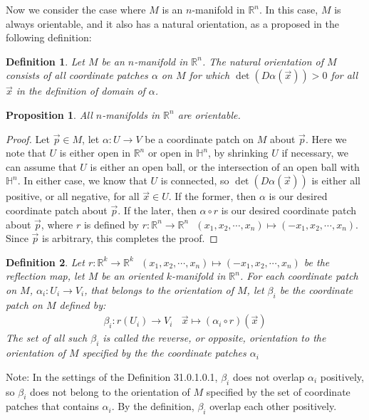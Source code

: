 \documentclass[15pt]{book}
\theoremstyle{break}
\theoremstyle{break}
\newtheorem{prop}[lem]{Proposition}
\newtheorem{defn}{Definition}[corL]
\newcommand{\R}{\mathbb{R}}
\newcommand{\note}{\color{red}Note: \color{black}}
\begin{document}
Now we consider the case where $M$ is an $n$-manifold in $\R^n$. In this case, $M$ is always orientable, and it also has a natural orientation, as a proposed in the following definition:
\begin{defn}
Let $M$ be an $n$-manifold in $\R^n$. The natural orientation of $M$ consists of all coordinate patches $\alpha$ on $M$ for which $\det(D\alpha(\vec{x})) >0$ for all $\vec{x}$ in the definition of domain of $\alpha$. 
\end{defn}

\begin{prop} All $n$-manifolds in $\R^n$ are orientable. 
\end{prop}
\begin{proof}
Let $\vec{p}\in M$, let $\alpha:U \to V$ be a coordinate patch on $M$ about $\vec{p}$. Here we note that $U$ is either open in $\R^n$ or open in $\mathbb{H}^n$, by shrinking $U$ if necessary, we can assume that $U$ is either an open ball, or the intersection of an open ball with $\mathbb{H}^n$. In either case, we know that $U$ is connected, so $\det(D\alpha(\vec{x}))$ is either all positive, or all negative, for all $\vec{x}\in U$. If the former, then $\alpha$ is our desired coordinate patch about $\vec{p}$. If the later, then $\alpha\circ r$ is our desired coordinate patch about $\vec{p}$, where $r$ is defined by $r:\R^n \to \R^n \ \ \ (x_1,x_2,\cdots, x_n) \mapsto (-x_1,x_2,\cdots, x_n)$. Since $\vec{p}$ is arbitrary, this completes the proof. 
\end{proof}

\begin{defn}
Let $r:\R^k \to \R^k \ \ \ (x_1,x_2,\cdots, x_n) \mapsto (-x_1,x_2,\cdots, x_n)$ be the reflection map, let $M$ be an oriented $k$-manifold in $\R^n$. For each coordinate patch on $M$, $\alpha_i :U_i \to V_i$, that belongs to the orientation of $M$, let $\beta_i $ be the coordinate patch on $M$ defined by:
\begin{align*}
\beta_i : r(U_i) \to V_i \ \ \ \ \vec{x}\mapsto (\alpha_i \circ r)(\vec{x})
\end{align*}
The set of all such $\beta_i$ is called the reverse, or opposite, orientation to the orientation of $M$ specified by the the coordinate patches $\alpha_i$
\end{defn}

\note In the settings of the Definition 31.0.1.0.1, $\beta_i$ does not overlap $\alpha_i$ positively, so $\beta_i$ does not belong to the orientation of $M$ specified by the set of coordinate patches that contains $\alpha_i$. By the definition, $\beta_i$ overlap each other positively. \\
\end{document}
